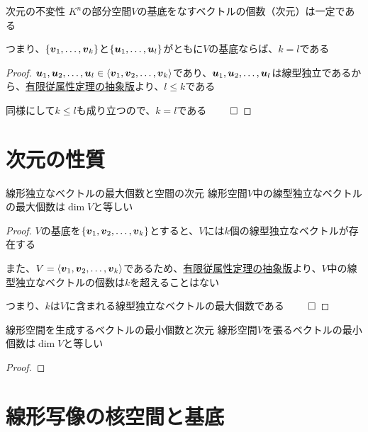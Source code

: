 \documentclass[../../../topic_linear-algebra]{subfiles}
\begin{document}
\begin{theorem}{次元の不変性}
  $K^n$の部分空間$V$の基底をなすベクトルの個数（次元）は一定である

  つまり、$\{ \vb*{v}_1, \dots, \vb*{v}_k \}$と$\{ \vb*{u}_1, \dots, \vb*{u}_l \}$がともに$V$の基底ならば、$k = l$である
\end{theorem}

\begin{proof}
  $\vb*{u}_1, \vb*{u}_2, \dots, \vb*{u}_l \in \langle \vb*{v}_1, \vb*{v}_2, \dots, \vb*{v}_k \rangle$であり、$\vb*{u}_1, \vb*{u}_2, \dots, \vb*{u}_l$は線型独立であるから、\hyperref[thm:abstract-finite-dependency]{有限従属性定理の抽象版}より、$l \leq k$である

  同様にして$k \leq l$も成り立つので、$k = l$である $\qed$
\end{proof}

\sectionline
\section{次元の性質}

\begin{theorem}{線形独立なベクトルの最大個数と空間の次元}
  線形空間$V$中の線型独立なベクトルの最大個数は$\dim V$と等しい
\end{theorem}

\begin{proof}
  $V$の基底を$\{ \vb*{v}_1, \vb*{v}_2, \dots, \vb*{v}_k \}$とすると、$V$には$k$個の線型独立なベクトルが存在する

  また、$V = \langle \vb*{v}_1, \vb*{v}_2, \dots, \vb*{v}_k \rangle$であるため、\hyperref[thm:abstract-finite-dependency]{有限従属性定理の抽象版}より、$V$中の線型独立なベクトルの個数は$k$を超えることはない

  つまり、$k$は$V$に含まれる線型独立なベクトルの最大個数である $\qed$
\end{proof}

\sectionline

\begin{theorem}{線形空間を生成するベクトルの最小個数と次元}
  線形空間$V$を張るベクトルの最小個数は$\dim V$と等しい
\end{theorem}

\begin{proof}
\end{proof}

\sectionline
\section{線形写像の核空間と基底}
\end{document}
